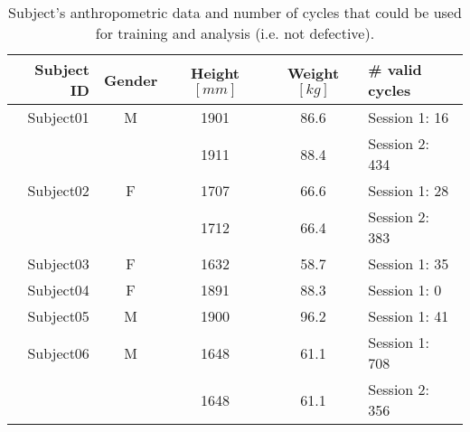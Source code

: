\begin{table}[ht!]
    \centering
    \caption{Subject's anthropometric data and number of cycles that could be used for training and analysis (i.e. not defective).}
    \label{tab:subject-table}
    \small
    \begin{tabular}{r | c c c | l}
        \textbf{Subject ID} & \textbf{Gender}   & \textbf{Height} $\left[mm\right]$  & \textbf{Weight} $\left[kg\right]$  & \textbf{\# valid cycles}\\ \hline
        Subject01           & M                 & 1901                  & 86.6                  & Session 1: 16 \\
                            &                   & 1911                  & 88.4                  & Session 2: 434 \\ \hline
        Subject02           & F                 & 1707                  & 66.6                  & Session 1: 28 \\
                            &                   & 1712                  & 66.4                  & Session 2: 383 \\ \hline
        Subject03           & F                 & 1632                  & 58.7                  & Session 1: 35 \\ \hline
        Subject04           & F                 & 1891                  & 88.3                  & Session 1: 0 \\ \hline
        Subject05           & M                 & 1900                  & 96.2                  & Session 1: 41 \\ \hline
        Subject06           & M                 & 1648                  & 61.1                  & Session 1: 708 \\
                            &                   & 1648                  & 61.1                  & Session 2: 356 \\ \hline
    \end{tabular}
\end{table}